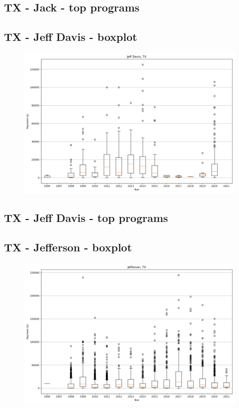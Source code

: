 \subsection*{TX - Jack - top programs}

\newpage
\subsection*{TX - Jeff Davis - boxplot}
\begin{figure}[h]
\centering
\includegraphics[width=7in]{../output/boxplots/counties/Jeff Davis-TX_boxplot.png}
\end{figure}


\subsection*{TX - Jeff Davis - top programs}

\newpage
\subsection*{TX - Jefferson - boxplot}
\begin{figure}[h]
\centering
\includegraphics[width=7in]{../output/boxplots/counties/Jefferson-TX_boxplot.png}
\end{figure}


